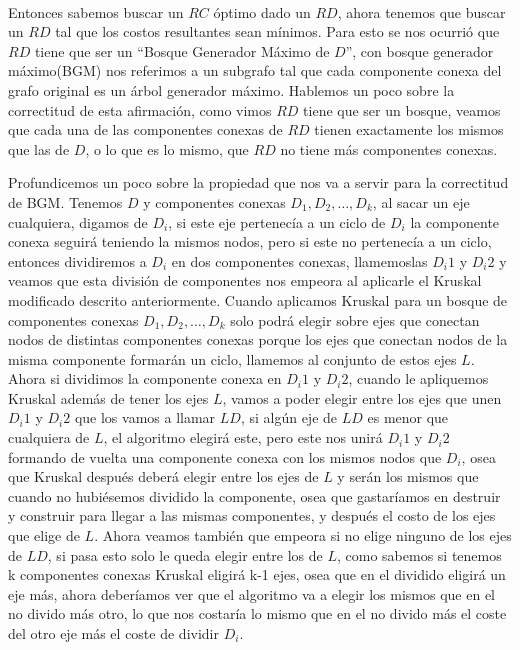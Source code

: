 \\
\par
Entonces sabemos buscar un $RC$ óptimo dado un $RD$, ahora tenemos que buscar un $RD$ tal que los costos resultantes sean mínimos. Para esto se nos ocurrió que $RD$ tiene que ser un “Bosque Generador Máximo de $D$”, con bosque generador máximo(BGM) nos referimos a un subgrafo tal que cada componente conexa del grafo original  es un árbol generador máximo. Hablemos un poco sobre la correctitud de esta afirmación, como vimos $RD$ tiene que ser un bosque, veamos que cada una de las componentes conexas de $RD$ tienen exactamente los mismos que las de $D$, o lo que es lo mismo, que $RD$ no tiene más componentes conexas.
\\
\par
Profundicemos un poco sobre la propiedad que nos va a servir para la correctitud de BGM. Tenemos $D$ y componentes conexas $D_1 , D_2 , … , D_k$, al sacar un eje cualquiera, digamos de $D_i$, si este eje pertenecía a un ciclo de $D_i$ la componente conexa seguirá teniendo la mismos nodos, pero si este no pertenecía a un ciclo, entonces dividiremos a $D_i$ en dos componentes conexas, llamemoslas $D_i1$ y $D_i2$ y veamos que esta división de componentes nos empeora al aplicarle el Kruskal modificado descrito anteriormente. Cuando aplicamos Kruskal para un bosque de componentes conexas $D_1 , D_2 , … , D_k$ solo podrá elegir sobre ejes que conectan nodos de distintas componentes conexas porque los ejes que conectan nodos de la misma componente formarán un ciclo, llamemos al conjunto de estos ejes $L$. Ahora si dividimos la componente conexa en $D_i1$ y $D_i2$, cuando le apliquemos Kruskal además de tener los ejes $L$, vamos a poder elegir entre los ejes que unen $D_i1$ y $D_i2$ que los vamos a llamar $LD$, si algún eje de $LD$ es menor que cualquiera de $L$, el algoritmo elegirá este, pero este nos unirá  $D_i1$ y $D_i2$ formando de vuelta una componente conexa con los mismos nodos que $D_i$, osea que Kruskal después deberá elegir entre los ejes de $L$ y serán los mismos que cuando no hubiésemos dividido la componente, osea que gastaríamos en destruir y construir para llegar a las mismas componentes, y después el costo de los ejes que elige de $L$. Ahora veamos también que empeora si no elige ninguno de los ejes de $LD$, si pasa esto solo le queda elegir entre los de $L$, como sabemos si tenemos k componentes conexas Kruskal eligirá k-1 ejes, osea que en el dividido eligirá un eje más, ahora deberíamos ver que el algoritmo va a elegir los mismos que en el no divido más otro, lo que nos costaría lo mismo que en el no divido más el coste del otro eje más el coste de dividir $D_i$.
